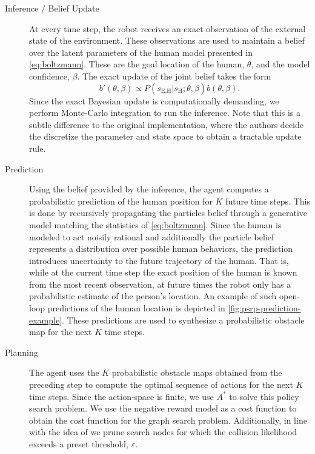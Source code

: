 \begin{description}
  \item[Inference / Belief Update] At every time step, the robot receives an
    exact observation of the external state of the environment. These
    observations are used to maintain a belief over the latent parameters of
    the human model presented in \cref{eq:boltzmann}. These are the goal
    location of the human, $\theta$, and the model confidence, $\beta$. The
    exact update of the joint belief takes the form \begin{equation} b'(\theta,
    \beta) \propto P(s_\text{E,H} | s_\text{H}; \theta, \beta) b(\theta,
    \beta). \end{equation} Since the exact Bayesian update is computationally
    demanding, we perform Monte-Carlo integration to run the inference. Note
    that this is a subtle difference to the original implementation, where the
    authors decide the discretize the parameter and state space to obtain
    a tractable update rule.
  \item[Prediction] Using the belief provided by the inference, the agent
    computes a probabilistic prediction of the human position for $K$ future
    time steps. This is done by recursively propagating the particles belief
    through a generative model matching the statistics of \cref{eq:boltzmann}.
    Since the human is modeled to act noisily rational and additionally the
    particle belief represents a distribution over possible human behaviors,
		the prediction introduces uncertainty to the future trajectory of the
		human. That is, while at the current time step the exact position of the
 		human is known from the most recent observation, at future times the
	  robot only has a probabilistic estimate of the person's location.
    An example of such open-loop predictions of the human location is depicted
    in \cref{fig:psrp-prediction-example}. These predictions are used to
    synthesize a probabilistic obstacle map for the next $K$ time steps.
  \item[Planning] The agent uses the $K$ probabilistic obstacle maps obtained
    from the preceding step to compute the optimal sequence of actions for the
    next $K$ time steps. Since the action-space is finite, we use $A^\ast$ to
    solve this policy search problem. We use the negative reward model as
    a cost function to obtain the cost function for the graph search problem.
    Additionally, in line with the idea of \cite{fisac2018probabilistically} we
    prune search nodes for which the collision likelihood exceeds a preset
    threshold, $\varepsilon$.
\end{description}

